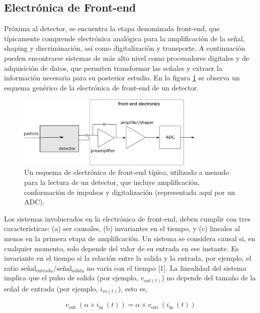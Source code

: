 \documentclass[]{book}
\begin{document}
\subsection{Electrónica de Front-end}

\noindent Próxima al detector, se encuentra la etapa denominada front-end, que típicamente comprende electrónica analógica para la amplificación de la señal, shaping y discriminación, así como digitalización y transporte. A continuación pueden encontrarse sistemas de más alto nivel como procesadores digitales y de adquisición de datos, que permiten transformar las señales y extraer la información necesaria para su posterior estudio. En la figura \ref{fig:generic_frontend} se observa un esquema genérico de la electrónica de front-end de un detector.\\

\begin{figure}[h]
    \centering
    \includegraphics[width=0.8\textwidth]{front-end.png}
    \caption{Un esquema de electrónica de front-end típico, utilizado a menudo para la lectura de un
    detector, que incluye amplificación, conformación de impulsos y digitalización (representada aquí por un ADC).}
    \label{fig:generic_frontend}

\end{figure}

\noindent Los sistemas involucrados en la electrónica de front-end, deben cumplir con tres características: (a) ser causales, (b) invariantes en el tiempo, y (c) lineales al menos en la primera etapa de amplificación. Un sistema se considera causal si, en cualquier momento, solo depende del valor de su entrada en ese instante. Es invariante en el tiempo si la relación entre la salida y la entrada, por ejemplo, el ratio $\text{señal}_{\text{entrada}}/\text{señal}_{\text{salida}}$ no varía con el tiempo [1]. La linealidad del sistema implica que el pulso de salida (por ejemplo, $v_{out(t)}$) no depende del tamaño de la señal de entrada (por ejemplo, $i_{in(t)}$), esto es, 

$$
v_{\text {out }}\left(\alpha \times i_{\text {in }}(t)\right)=\alpha \times v_{\text {out }}\left(i_{\text {in }}(t)\right)
$$
\end{document}
